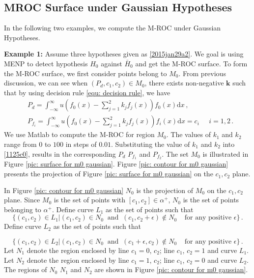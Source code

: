 \subsection{MROC Surface  under Gaussian Hypotheses}
In the following two examples, we compute the M-ROC under Gaussian Hypotheses. 

\noindent \textbf{Example 1:}
Assume three hypotheses given as \eqref{2015jan29a2}. We goal is using MENP to detect hypothesis $H_0$ against $\bar{H}_0$ and get the M-ROC surface.  
To form the M-ROC surface, we first consider points belong to $M_0$.
From previous discussion, we can see when $(P_d, c_1, c_2) \in M_0$, there exists non-negative $\mathbf{k}$ such that by using decision rule \eqref{equ: decision rule},
we have 
\begin{equation}
\begin{split}
\label{1125c0}
&P_d = \int_{-\infty}^{\infty} u(f_0(x) - \sum_{j=1}^{2}k_jf_j(x)) f_0(x)\mathrm{d}x    \,, \\
&P_{f_i} = \int_{-\infty}^{\infty} u(f_0(x) - \sum_{j=1}^{2}k_jf_j(x)) f_i(x) \mathrm{d}x = c_i\;\;\;\;\;    i=1, 2\,.
\end{split}
\end{equation}
We use Matlab to compute the M-ROC for region $M_0$. The values of $k_1$ and $k_2$ range from $0$ to $100$ in steps of $0.01$. Substituting the value of $k_1$ and $k_2$ into \eqref{1125c0}, results in the corresponding $P_d$ $P_{f_1}$ and $P_{f_2}$.  The set $M_0$ is illustrated in Figure \ref{pic: surface for m0 gaussian}. Figure \ref{pic: contour for m0 gaussian} presents the projection of Figure \ref{pic: surface for m0 gaussian} on the $c_1, c_2$ plane.



In Figure \ref{pic: contour for m0 gaussian} $N_0$ is the projection of $M_0$ on the $c_1, c_2$ plane. Since $M_0$ is the set of points with $[c_1, c_2] \in \alpha^+$, $N_0$ is the set of points belonging to $\alpha^+$.
Define curve $L_1$ as the set of points such that 
\[
\{ (c_1, c_2) \in L_1 | (c_1, c_2) \in {N}_0 \;\;\text{and} \;\;(c_1, c_2+\epsilon)\notin {N}_0 \;\;\;\;\text{for any positive $\epsilon$} \}\,.
\]
Define curve $L_2$ as the set of points such that 

\[
\{ (c_1, c_2) \in L_2 | (c_1, c_2) \in {N}_0 \;\;\text{and} \;\;(c_1 + \epsilon, c_2)\notin {N}_0 \;\;\;\;\text{for any positive $\epsilon$} \}\,.
\]
Let $N_1$ denote the region enclosed by line $c_1 = 0$, $c_2$; line $c_1$, $c_2 = 1$ and curve $L_1$.
Let $N_2$ denote the region enclosed by line $c_1 = 1$, $c_2$; line $c_1$, $c_2 = 0$ and curve $L_2$.
The regions of $N_0$ $N_1$ and $N_2$ are shown in Figure \ref{pic: contour for m0 gaussian}.

